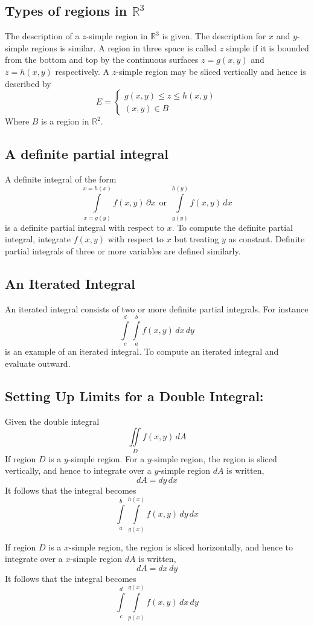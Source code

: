\documentclass[14pt]{article}
\begin{document}
    \subsection{Types of regions in $\mathbb{R}^3$}
    The description of a $z$-simple region in $\mathbb{R}^3$ is given.
    The description for $x$ and $y$-simple regions is similar. A region
    in three space is called $z$ simple if it is bounded from the bottom
    and top by the continuous surfaces $z=g(x,y)$ and $z=h(x,y)$
    respectively. A $z$-simple region may be sliced vertically and hence
    is described by 
    $$E=\left\{\begin{array}{lr} g(x,y)\leq z\leq h(x,y)\\
        (x,y)\in B \end{array}\right.$$ Where $B$ is a region in
    $\mathbb{R}^2$.
    \subsection{A definite partial integral}
    A definite integral of the form 
    $$\int\limits_{x=g(y)}^{x=h(x)}f(x,y)\, \partial x\ \ \mathrm{ or }\
    \ \int\limits_{g(y)}^{h(y)}f(x,y)\, dx$$ is a definite partial
    integral with respect to $x$. To compute the definite partial
    integral, integrate $f(x,y)$ with respect to $x$ but treating $y$ as
    constant. Definite partial integrals of three or more variables are
    defined similarly.
    \subsection{An Iterated Integral}
    An iterated integral consists of two or more definite partial
    integrals. For instance
    $$\int\limits_c^d\int\limits_a^b f(x,y)\, dx\, dy$$ is an example of
    an iterated integral. To compute an iterated integral and evaluate
    outward.
    \subsection{Setting Up Limits for a Double Integral:}
    Given the double integral
    $$\iint\limits_D f(x,y)\, dA$$ If region $D$ is a $y$-simple region.
    For a $y$-simple region, the region is sliced vertically, and hence
    to integrate over a $y$-simple region $dA$ is written,
    $$dA=dy\, dx$$ It follows that the integral becomes
    $$\int\limits_a^b\int\limits_{g(x)}^{h(x)}f(x,y)\, dy\, dx$$

    If region $D$ is a $x$-simple region, the region is sliced
    horizontally, and hence to integrate over a $x$-simple region $dA$
    is written,
    $$dA=dx\, dy$$ It follows that the integral becomes
    $$\int\limits_c^d\int\limits_{p(x)}^{q(x)}f(x,y)\, dx\, dy$$
\end{document}
